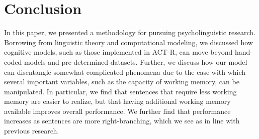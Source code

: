 \section{Conclusion}
In this paper, we presented a methodology for pursuing psycholinguistic research. Borrowing from linguistic theory and computational modeling, we discussed how cognitive models, such as those implemented in ACT-R, can move beyond hand-coded models and pre-determined datasets. Further, we discuss how our model can disentangle somewhat complicated phenomena due to the ease with which several important variables, such as the capacity of working memory, can be manipulated. In particular, we find that sentences that require less working memory are easier to realize, but that having additional working memory available improves overall performance. We further find that performance increases as sentences are more right-branching, which we see as in line with previous research.